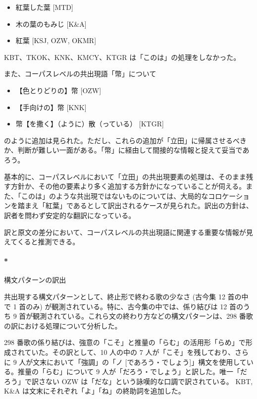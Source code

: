 \documentclass[
  letterpaper,
  DIV=11,
  numbers=noendperiod]{scrartcl}
\let\oldparagraph\paragraph
\renewcommand{\paragraph}[1]{\oldparagraph{#1}\mbox{}}
\providecommand{\tightlist}{%
  \setlength{\itemsep}{0pt}\setlength{\parskip}{0pt}}\usepackage{longtable,booktabs,array}
\begin{document}
\begin{itemize}
\tightlist
\item
  紅葉した葉 {[}MTD{]}
\item
  木の葉のもみじ {[}K\&A{]}
\item
  紅葉 {[}KSJ, OZW, OKMR{]}
\end{itemize}

KBT、TKOK、KNK、KMCY、KTGR は「このは」の処理をしなかった。

また、コーパスレベルの共出現語「幣」について

\begin{itemize}
\tightlist
\item
  【色とりどりの】幣 {[}OZW{]}
\item
  【手向けの】幣 {[}KNK{]}
\item
  幣【を撒く】（ように）散（っている） {[}KTGR{]}
\end{itemize}

のように追加は見られた。ただし、これらの追加が「立田」に帰属させるべきか、判断が難しい一面がある。「幣」に経由して間接的な情報と捉えて妥当であろう。

基本的に、コーパスレベルにおいて「立田」の共出現要素の処理は、そのまま残す方針か、その他の要素より多く追加する方針かになっていることが伺える。また、「このは」のような共出現ではないものについては、大局的なコロケーションを踏まえ「紅葉」であるとして訳出されるケースが見られた。訳出の方針は、訳者を問わず安定的な翻訳になっている。

訳と原文の差分において、コーパスレベルの共出現語に関連する重要な情報が見えてくると推測できる。

\paragraph*{構文パターンの訳出}\label{ux69cbux6587ux30d1ux30bfux30fcux30f3ux306eux8a33ux51fa}

共出現する構文パターンとして、終止形で終わる歌の少なさ (古今集 12
首の中で 1 首のみ) が観測されている。特に、古今集の中では、係り結びは 12
首のうち 9
首が観測されている。これら文の終わり方などの構文パターンは、298
番歌の訳における処理について分析した。

298
番歌の係り結びは、強意の「こそ」と推量の「らむ」の活用形「らめ」で形成されていた。その訳として、10
人の中の 7 人が「こそ」を残しており、さらに 9
人が文末において「強調」の「ノ
{[}であろう・でしょう{]}」構文を使用している。推量の「らむ」について 9
人が「だろう・でしょう」と訳した。唯一「だろう」で訳さない OZW
は「だな」という詠嘆的な口調で訳されている。 KBT, K\&A
は文末にそれぞれ「よ」「ね」の終助詞を追加した。
\end{document}
